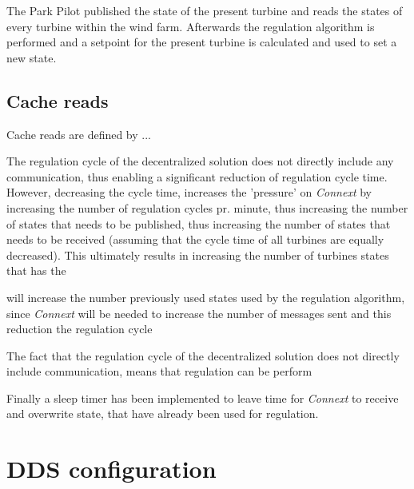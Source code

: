 The Park Pilot published the state of the present turbine and reads the states of every turbine within the wind farm. Afterwards the regulation algorithm is performed and a setpoint for the present turbine is calculated and used to set a new state.

\subsection{Cache reads}
Cache reads are defined by ...

The regulation cycle of the decentralized solution does not directly include any communication, thus enabling a significant reduction of regulation cycle time. However, decreasing the cycle time, increases the 'pressure' on \textit{Connext} by increasing the number of regulation cycles pr. minute, thus increasing the number of states that needs to be published, thus increasing the number of states that needs to be received (assuming that the cycle time of all turbines are equally decreased). This ultimately results in increasing the number of turbines states that has the


  will increase the number previously used states used by the regulation algorithm, since \textit{Connext} will be needed to increase the number of messages sent and  this reduction  the regulation cycle  

The fact that the regulation cycle of the decentralized solution does not directly include communication, means that regulation can be perform

Finally a sleep timer has been implemented to leave time for \textit{Connext} to receive and overwrite state, that have already been used for regulation.



\section{DDS configuration}
\label{sec:decen:ddsconf}

